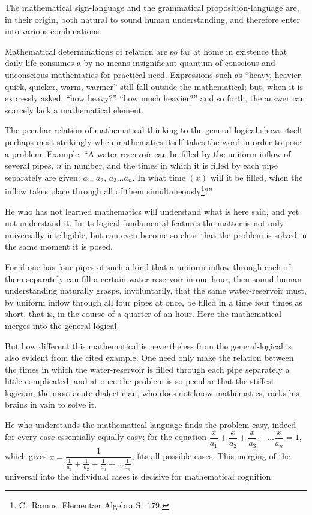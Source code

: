 \documentclass[12pt]{book}
\begin{document}
The mathematical sign-language and the grammatical proposition-language are, in
their origin, both natural to sound human understanding, and therefore enter
into various combinations.

Mathematical determinations of relation are so far at home in existence that
daily life consumes a by no means insignificant quantum of conscious and
unconscious mathematics for practical need. Expressions such as ``heavy,
heavier, quick, quicker, warm, warmer'' still fall outside the mathematical;
but, when it is expressly asked: ``how heavy?''
``how much heavier?'' and so forth, the answer can scarcely lack a mathematical
element.

The peculiar relation of mathematical thinking to the general-logical shows
itself perhaps most strikingly when mathematics itself takes the word in order
to pose a problem. Example. ``A water-reservoir can be filled by the uniform
inflow of several pipes, $n$ in number, and the times in which it is filled by
each pipe separately are given: $a_1$, $a_2$, $a_3\dots a_n$. In what time $(x)$
will it be filled, when the inflow takes place through all of them
simultaneously\footnote{C.\ Ramus. Elementær Algebra S.\ 179.}?''

He who has not learned mathematics will understand what is here said, and yet not
understand it. In its logical fundamental features the matter is not only
universally intelligible, but can even become so clear that the problem is solved
in the same moment it is posed.

For if one has four pipes of such a kind that a uniform inflow through each of
them separately can fill a certain water-reservoir in one hour, then sound human
understanding naturally grasps, involuntarily, that the same water-reservoir
must, by uniform inflow through all four pipes at once, be filled in a time four
times as short, that is, in the course of a quarter of an hour. Here the
mathematical merges into the general-logical.

But how different this mathematical is nevertheless from the general-logical is
also evident from the cited example. One need only make the relation between the
times in which the water-reservoir is filled through each pipe separately a
little complicated; and at once the problem is so peculiar that the stiffest
logician, the most acute dialectician, who does not know mathematics, racks his
brains in vain to solve it.

He who understands the mathematical language finds the problem easy, indeed for
every case essentially equally easy; for
the equation $\dfrac{x}{a_1}+\dfrac{x}{a_2}+\dfrac{x}{a_3}+\dots\dfrac{x}{a_n}=1$,
which gives $x = \dfrac{1}{\frac{1}{a_1}+\frac{1}{a_2}+\frac{1}{a_3}+\dots
\frac{1}{a_n}}$, fits all possible cases. This merging of the universal into the
individual cases is decisive for mathematical cognition.
\end{document}
